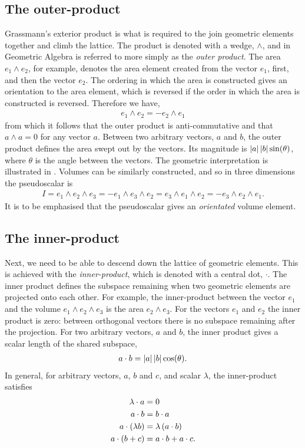 \subsection{The outer-product}

Grassmann's exterior product is what is required to the join geometric elements together and climb the lattice.
The product is denoted with a wedge, $\wedge$, and in Geometric Algebra is referred to more simply as the {\em outer product}.
The area $e_1\wedge e_2$, for example, denotes the area element created from the vector $e_1$, first, and then the vector $e_2$.
The ordering in which the area is constructed gives an orientation to the area element,
which is reversed if the order in which the area is constructed is reversed.
Therefore we have,
\begin{align}
  e_1 \wedge e_2 = -e_2 \wedge e_1
\end{align}
from which it follows that the outer product is anti-commutative and that $a \wedge a = 0$ for any vector $a$.
Between two arbitrary vectors, $a$ and $b$, the outer product defines the area swept out by the vectors.
Its magnitude is $\left| a \right|\left| b \right|\sin(\theta)$,
where $\theta$ is the angle between the vectors.
The geometric interpretation is illustrated in .
Volumes can be similarly constructed,
and so in three dimensions the pseudoscalar is 
\begin{align}
  I = e_1\wedge e_2 \wedge e_3 = - e_1\wedge e_3 \wedge e_2 =  e_3 \wedge e_1 \wedge e_2  = - e_3 \wedge e_2 \wedge e_1.
\end{align}
It is to be emphasised that the pseudoscalar gives an {\em orientated} volume element.

\subsection{The inner-product}

Next, we need to be able to descend down the lattice of geometric elements.
This is achieved with the {\em inner-product}, which is denoted with a central dot, $\cdot$.
The inner product defines the subspace remaining when two geometric elements are projected onto each other.
For example, the inner-product between the vector $e_1$ and the volume $e_1\wedge e_2 \wedge e_3$
is the area $e_2\wedge e_3$.
For the vectors $e_1$ and $e_2$ the inner product is zero:
between orthogonal vectors there is no subspace remaining after the projection.
For two arbitrary vectors, $a$ and $b$, the inner product gives a scalar length of the shared subspace,
\begin{align}
  a\cdot b = \left| a \right|\left| b \right|\cos(\theta).
\end{align}
In general, for arbitrary vectors, $a$, $b$ and $c$, and scalar $\lambda$,
the inner-product satisfies
\begin{align}
  \lambda \cdot a &= 0 \\
  a\cdot b &= b\cdot a\\
  a\cdot(\lambda b) &= \lambda \left( a\cdot b \right)\\
  a\cdot(b+c) &= a\cdot b + a\cdot c.
\end{align}

